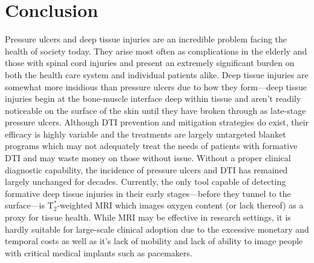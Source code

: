 \chapter{Conclusion}
\label{chap:conclusion}
	Pressure ulcers and deep tissue injuries are an incredible problem facing the health of society today. They arise most often as complications in the elderly and those with spinal cord injuries and present an extremely significant burden on both the health care system and individual patients alike. Deep tissue injuries are somewhat more insidious than pressure ulcers due to how they form---deep tissue injuries begin at the bone-muscle interface deep within tissue and aren't readily noticeable on the surface of the skin until they have broken through as late-stage pressure ulcers. Although DTI prevention and mitigation strategies do exist, their efficacy is highly variable and the treatments are largely untargeted blanket programs which may not adequately treat the needs of patients with formative DTI and may waste money on those without issue. Without a proper clinical diagnostic capability, the incidence of pressure ulcers and DTI has remained largely unchanged for decades. Currently, the only tool capable of detecting formative deep tissue injuries in their early stages---before they tunnel to the surface---is $\mathrm{T}_2^*$-weighted MRI which images oxygen content (or lack thereof) as a proxy for tissue health. While MRI may be effective in research settings, it is hardly suitable for large-scale clinical adoption due to the excessive monetary and temporal costs as well as it's lack of mobility and lack of ability to image people with critical medical implants such as pacemakers.

